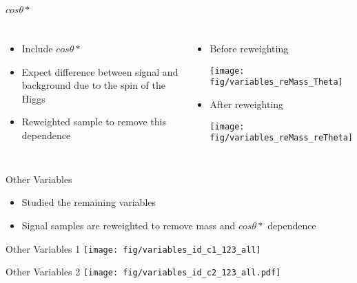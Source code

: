 \documentclass[t]{beamer}
\begin{document}
\begin{frame}{$cos\theta*$}
  \begin{columns}[c]
  \begin{itemize}
    \item Include $cos\theta*$
    \item Expect difference between signal and background due to the spin of the Higgs
    \item Reweighted sample to remove this dependence
  \end{itemize}
    \begin{itemize}  
      \item Before reweighting 

      \texttt{[image: fig/variables\_reMass\_Theta]}
  
      \item After reweighting 

      \texttt{[image: fig/variables\_reMass\_reTheta]}
    \end{itemize}
  \end{columns}
\end{frame}

\begin{frame}{Other Variables}
  \begin{itemize}  
   \item Studied the remaining variables 
   \item Signal samples are reweighted to remove mass and $cos\theta*$
   dependence
   \end{itemize}
\end{frame}

\begin{frame}{Other Variables 1}
    \texttt{[image: fig/variables\_id\_c1\_123\_all]}
\end{frame}

\begin{frame}{Other Variables 2}
    \texttt{[image: fig/variables\_id\_c2\_123\_all.pdf]}
\end{frame}
\end{document}
